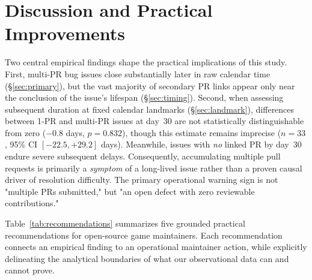 \section{Discussion and Practical Improvements}\label{sec:implications}

Two central empirical findings shape the practical implications of this study. First, multi-PR bug issues close substantially later in raw calendar time (\S\ref{sec:primary}), but the vast majority of secondary PR links appear only near the conclusion of the issue's lifespan (\S\ref{sec:timing}). Second, when assessing subsequent duration at fixed calendar landmarks (\S\ref{sec:landmark}), differences between 1-PR and multi-PR issues at day~30 are not statistically distinguishable from zero ($-0.8$ days, $p=0.832$), though this estimate remains imprecise ($n=33$, 95\% CI $[-22.5, +29.2]$ days). Meanwhile, issues with \emph{no} linked PR by day~30 endure severe subsequent delays. Consequently, accumulating multiple pull requests is primarily a \emph{symptom} of a long-lived issue rather than a proven causal driver of resolution difficulty. The primary operational warning sign is not "multiple PRs submitted," but "an open defect with zero reviewable contributions."

Table~\ref{tab:recommendations} summarizes five grounded practical recommendations for open-source game maintainers. Each recommendation connects an empirical finding to an operational maintainer action, while explicitly delineating the analytical boundaries of what our observational data can and cannot prove.

